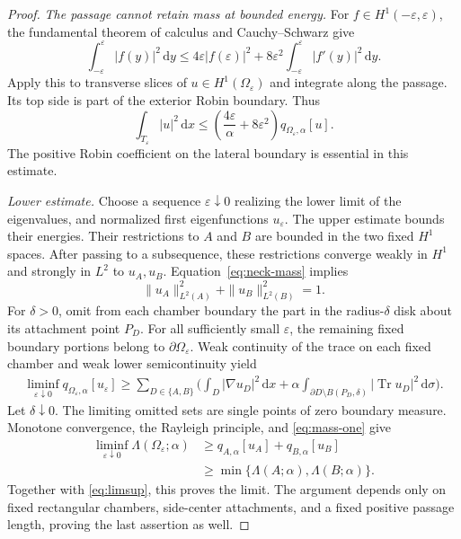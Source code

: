 \documentclass[11pt,a4paper]{article}
\theoremstyle{definition}\newtheorem{definition}[theorem]{Definition}
\theoremstyle{remark}\newtheorem{remark}[theorem]{Remark}
\newcommand{\dd}{\,\mathrm d}
\DeclareMathOperator{\Tr}{Tr}
\begin{document}
\begin{proof}
\emph{The passage cannot retain mass at bounded energy.}
For $f\in H^1(-\varepsilon,\varepsilon)$, the fundamental
theorem of calculus and Cauchy--Schwarz give
\[
 \int_{-\varepsilon}^{\varepsilon}|f(y)|^2\dd y
 \le4\varepsilon|f(\varepsilon)|^2
       +8\varepsilon^2\int_{-\varepsilon}^{\varepsilon}|f'(y)|^2\dd y.
\]
Apply this to transverse slices of $u\in H^1(\Omega_\varepsilon)$
and integrate along the passage. Its top side is part of the
exterior Robin boundary. Thus
\begin{equation}\label{eq:neck-mass}
 \int_{T_\varepsilon}|u|^2\dd x
 \le\left(\frac{4\varepsilon}{\alpha}+8\varepsilon^2\right)
           q_{\Omega_\varepsilon,\alpha}[u].
\end{equation}
The positive Robin coefficient on the lateral boundary is
essential in this estimate.

\emph{Lower estimate.}
Choose a sequence $\varepsilon\downarrow0$ realizing the lower
limit of the eigenvalues, and normalized first eigenfunctions
$u_\varepsilon$. The upper estimate bounds their energies.
Their restrictions to $A$ and $B$ are bounded in the two fixed
$H^1$ spaces. After passing to a subsequence, these restrictions
converge weakly in $H^1$ and strongly in $L^2$ to $u_A,u_B$.
Equation~\eqref{eq:neck-mass} implies
\begin{equation}\label{eq:mass-one}
 \|u_A\|_{L^2(A)}^2+\|u_B\|_{L^2(B)}^2=1.
\end{equation}
For $\delta>0$, omit from each chamber boundary the part in
the radius-$\delta$ disk about its attachment point $P_D$.
For all sufficiently small $\varepsilon$, the remaining fixed
boundary portions belong to $\partial\Omega_\varepsilon$.
Weak continuity of the trace on each fixed chamber and weak
lower semicontinuity yield
\begin{align*}
 \liminf_{\varepsilon\downarrow0}
 q_{\Omega_\varepsilon,\alpha}[u_\varepsilon]
 \ge\sum_{D\in\{A,B\}}\biggl(
 \int_D|\nabla u_D|^2\dd x
 +\alpha\int_{\partial D\setminus B(P_D,\delta)}
             |\Tr u_D|^2\dd\sigma\biggr).
\end{align*}
Let $\delta\downarrow0$. The limiting omitted sets are single
points of zero boundary measure. Monotone convergence, the
Rayleigh principle, and \eqref{eq:mass-one} give
\begin{align*}
 \liminf_{\varepsilon\downarrow0}\Lambda(\Omega_\varepsilon;\alpha)
 &\ge q_{A,\alpha}[u_A]+q_{B,\alpha}[u_B]\\
 &\ge\min\{\Lambda(A;\alpha),\Lambda(B;\alpha)\}.
\end{align*}
Together with \eqref{eq:limsup}, this proves the limit. The
argument depends only on fixed rectangular chambers, side-center
attachments, and a fixed positive passage length, proving the
last assertion as well.
\end{proof}
\end{document}
